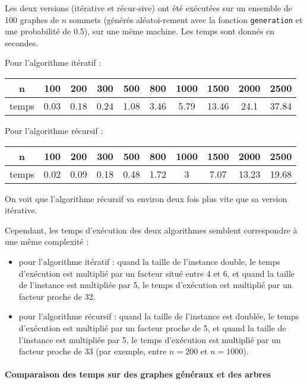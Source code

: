 \documentclass[a4paper,10pt]{article}
\begin{document}
Les deux versions (itérative et récur-sive) ont été exécutées sur un ensemble de 100 graphes de $n$ sommets (générés aléatoi-rement avec la fonction \texttt{generation} et une probabilité de 0.5), sur une même machine.
Les temps sont donnés en secondes.

Pour l'algorithme itératif :
\begin{center}
\begin{tabular}{|c|c|c|c|c|c|c|c|c|c|}
	\hline 
	n & 100 & 200 & 300 & 500 & 800 & 1000 & 1500 & 2000 & 2500 \\
	\hline
	temps & 0.03 & 0.18 & 0.24 & 1.08 & 3.46 & 5.79 & 13.46 & 24.1 & 37.84 \\
	\hline
\end{tabular}
\end{center}

Pour l'algorithme récursif :
\begin{center}
\begin{tabular}{|c|c|c|c|c|c|c|c|c|c|}
	\hline 
	n & 100 & 200 & 300 & 500 & 800 & 1000 & 1500 & 2000 & 2500 \\
	\hline
	temps & 0.02 & 0.09 & 0.18 & 0.48 & 1.72 & 3 & 7.07 & 13.23 & 19.68\\
	\hline
\end{tabular}
\end{center}

On voit que l'algorithme récursif va environ deux fois plus vite que sa version itérative.

Cependant, les temps d'exécution des deux algorithmes semblent correspondre à une même complexité : 
\begin{itemize}
\item pour l'algorithme itératif : quand la taille de l'instance double, le temps d'exécution est multiplié par un facteur situé entre 4 et 6, et quand la taille de l'instance est multipliée par 5, le temps d'exécution est multiplié par un facteur proche de 32.
\item pour l'algorithme récursif : quand la taille de l'instance est doublée, le temps d'exécution est multiplié par un facteur proche de 5, et quand la taille de l'instance est multipliée par 5, le temps d'exécution est multiplié par un facteur proche de 33 (par exemple, entre $n = 200$ et $n = 1000$).
\end{itemize}

\paragraph{Comparaison des temps sur des graphes généraux et des arbres}
\end{document}
